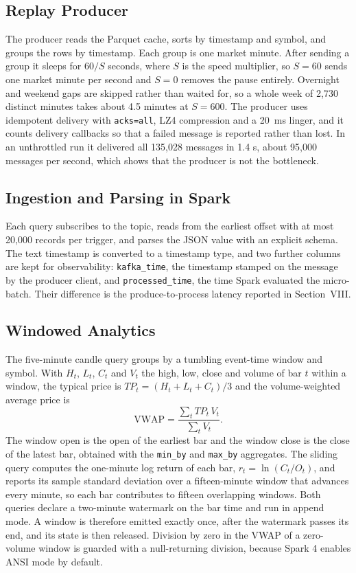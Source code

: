 \documentclass[conference]{IEEEtran}
\newcommand{\code}[1]{\texttt{#1}}
\begin{document}
\subsection{Replay Producer}
The producer reads the Parquet cache, sorts by timestamp and symbol, and groups the rows by timestamp. Each group is one market minute. After sending a group it sleeps for $60/S$ seconds, where $S$ is the speed multiplier, so $S=60$ sends one market minute per second and $S=0$ removes the pause entirely. Overnight and weekend gaps are skipped rather than waited for, so a whole week of 2,730 distinct minutes takes about 4.5 minutes at $S=600$. The producer uses idempotent delivery with \code{acks=all}, LZ4 compression and a 20~ms linger, and it counts delivery callbacks so that a failed message is reported rather than lost. In an unthrottled run it delivered all 135,028 messages in 1.4 s, about 95,000 messages per second, which shows that the producer is not the bottleneck.

\subsection{Ingestion and Parsing in Spark}
Each query subscribes to the topic, reads from the earliest offset with at most 20,000 records per trigger, and parses the JSON value with an explicit schema. The text timestamp is converted to a timestamp type, and two further columns are kept for observability: \code{kafka\_time}, the timestamp stamped on the message by the producer client, and \code{processed\_time}, the time Spark evaluated the micro-batch. Their difference is the produce-to-process latency reported in Section~VIII.

\subsection{Windowed Analytics}
The five-minute candle query groups by a tumbling event-time window and symbol. With $H_t$, $L_t$, $C_t$ and $V_t$ the high, low, close and volume of bar $t$ within a window, the typical price is $TP_t=(H_t+L_t+C_t)/3$ and the volume-weighted average price is
\begin{equation}
\mathrm{VWAP}=\frac{\sum_t TP_t\,V_t}{\sum_t V_t}.
\end{equation}
The window open is the open of the earliest bar and the window close is the close of the latest bar, obtained with the \code{min\_by} and \code{max\_by} aggregates. The sliding query computes the one-minute log return of each bar, $r_t=\ln(C_t/O_t)$, and reports its sample standard deviation over a fifteen-minute window that advances every minute, so each bar contributes to fifteen overlapping windows. Both queries declare a two-minute watermark on the bar time and run in append mode. A window is therefore emitted exactly once, after the watermark passes its end, and its state is then released. Division by zero in the VWAP of a zero-volume window is guarded with a null-returning division, because Spark 4 enables ANSI mode by default.
\end{document}
